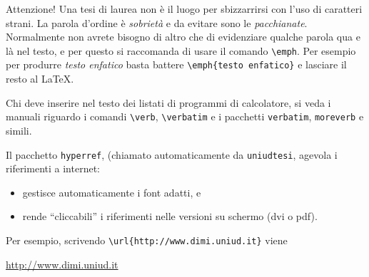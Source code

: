 Attenzione! Una tesi di laurea non \`e il luogo per
sbizzarrirsi con l'uso di caratteri strani. La parola
d'ordine \`e \emph{sobriet\`a} e da evitare sono le
\emph{pacchianate}. Normalmente non avrete bisogno di
altro che di evidenziare qualche parola qua e l\`a nel
testo, e per questo si raccomanda di usare il comando
\verb!\emph!. Per esempio per produrre
\emph{testo enfatico} basta battere
\verb!\emph{testo enfatico}! e lasciare il resto al
\LaTeX.

Chi deve inserire nel testo dei listati di programmi di
calcolatore, si veda i manuali riguardo i comandi
\verb!\verb!, \verb!\verbatim! e i pacchetti
\verb!verbatim!, \verb!moreverb! e simili.

Il pacchetto \verb!hyperref!, (chiamato automaticamente da \verb!uniudtesi!, agevola i riferimenti a internet:

\begin{itemize}

\item gestisce automaticamente i font adatti, e 

\item rende ``cliccabili'' i riferimenti nelle versioni su schermo (dvi o pdf).

\end{itemize}

\noindent Per esempio, scrivendo \verb!\url{http://www.dimi.uniud.it}! viene

\begin{center}
\url{http://www.dimi.uniud.it}
\end{center}